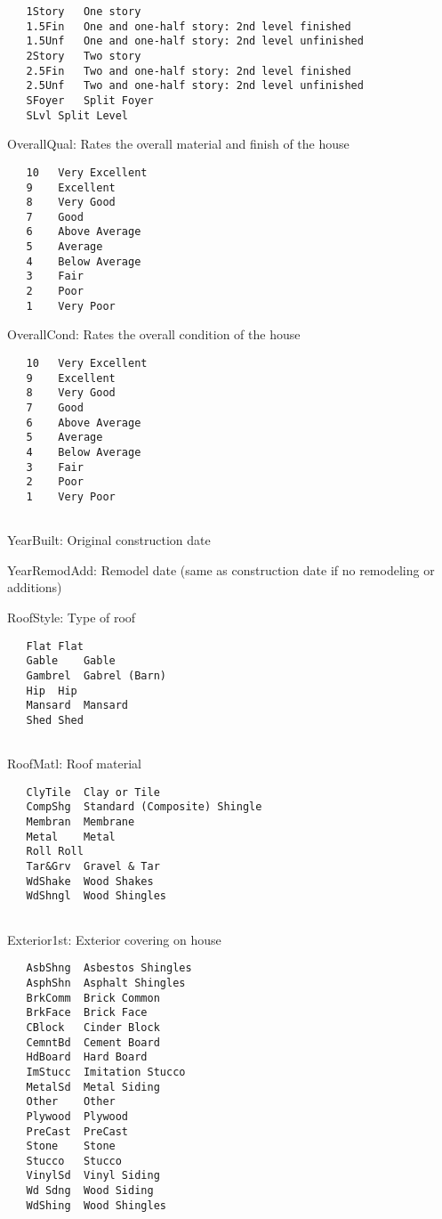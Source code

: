 \documentclass[]{article}
\begin{document}
\begin{verbatim}
   1Story   One story
   1.5Fin   One and one-half story: 2nd level finished
   1.5Unf   One and one-half story: 2nd level unfinished
   2Story   Two story
   2.5Fin   Two and one-half story: 2nd level finished
   2.5Unf   Two and one-half story: 2nd level unfinished
   SFoyer   Split Foyer
   SLvl Split Level
\end{verbatim}

OverallQual: Rates the overall material and finish of the house

\begin{verbatim}
   10   Very Excellent
   9    Excellent
   8    Very Good
   7    Good
   6    Above Average
   5    Average
   4    Below Average
   3    Fair
   2    Poor
   1    Very Poor
\end{verbatim}

OverallCond: Rates the overall condition of the house

\begin{verbatim}
   10   Very Excellent
   9    Excellent
   8    Very Good
   7    Good
   6    Above Average   
   5    Average
   4    Below Average   
   3    Fair
   2    Poor
   1    Very Poor
    
\end{verbatim}

YearBuilt: Original construction date

YearRemodAdd: Remodel date (same as construction date if no remodeling
or additions)

RoofStyle: Type of roof

\begin{verbatim}
   Flat Flat
   Gable    Gable
   Gambrel  Gabrel (Barn)
   Hip  Hip
   Mansard  Mansard
   Shed Shed
    
\end{verbatim}

RoofMatl: Roof material

\begin{verbatim}
   ClyTile  Clay or Tile
   CompShg  Standard (Composite) Shingle
   Membran  Membrane
   Metal    Metal
   Roll Roll
   Tar&Grv  Gravel & Tar
   WdShake  Wood Shakes
   WdShngl  Wood Shingles
    
\end{verbatim}

Exterior1st: Exterior covering on house

\begin{verbatim}
   AsbShng  Asbestos Shingles
   AsphShn  Asphalt Shingles
   BrkComm  Brick Common
   BrkFace  Brick Face
   CBlock   Cinder Block
   CemntBd  Cement Board
   HdBoard  Hard Board
   ImStucc  Imitation Stucco
   MetalSd  Metal Siding
   Other    Other
   Plywood  Plywood
   PreCast  PreCast 
   Stone    Stone
   Stucco   Stucco
   VinylSd  Vinyl Siding
   Wd Sdng  Wood Siding
   WdShing  Wood Shingles
\end{verbatim}
\end{document}
